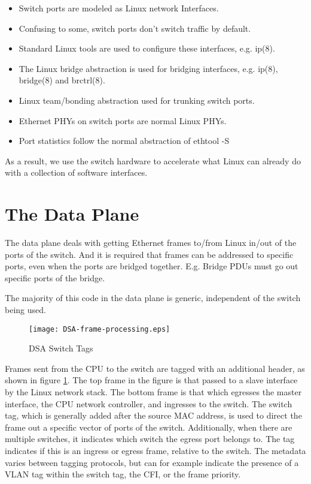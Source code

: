 \documentclass[letterpaper]{article}
\begin{document}
\begin{itemize}
\item Switch ports are modeled as Linux network Interfaces.
\item Confusing to some, switch ports don't switch traffic by default.
\item Standard Linux tools are used to configure these interfaces, e.g. ip(8).
\item The Linux bridge abstraction is used for bridging interfaces, e.g. ip(8), bridge(8) and brctrl(8).
\item Linux team/bonding abstraction used for trunking switch ports.
\item Ethernet PHYs on switch ports are normal Linux PHYs.
\item Port statistics follow the normal abstraction of ethtool -S
\end{itemize}

As a result, we use the switch hardware to accelerate what Linux can
already do with a collection of software interfaces.

\section{The Data Plane}

The data plane deals with getting Ethernet frames to/from Linux in/out
of the ports of the switch. And it is required that frames can be
addressed to specific ports, even when the ports are bridged together.
E.g. Bridge PDUs must go out specific ports of the bridge.

The majority of this code in the data plane is generic, independent of
the switch being used.

\begin{figure}[ht]
  \centering
  \texttt{[image: DSA-frame-processing.eps]}
  \caption{DSA Switch Tags}
  \label{DSA-frame-processing}
\end{figure}

Frames sent from the CPU to the switch are tagged with an additional
header, as shown in figure \ref{DSA-frame-processing}. The top frame
in the figure is that passed to a slave interface by the Linux network
stack. The bottom frame is that which egresses the master interface,
the CPU network controller, and ingresses to the switch. The switch
tag, which is generally added after the source MAC address, is used to
direct the frame out a specific vector of ports of the switch.
Additionally, when there are multiple switches, it indicates which
switch the egress port belongs to. The tag indicates if this is an
ingress or egress frame, relative to the switch. The metadata varies
between tagging protocols, but can for example indicate the presence
of a VLAN tag within the switch tag, the CFI, or the frame priority.
\end{document}
